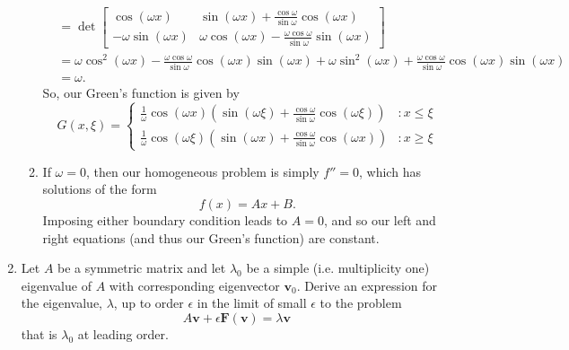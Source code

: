 \documentclass[10pt,letterpaper]{report}
\newcommand{\bvec}[1]{\mathbf{#1}}
\newcommand{\mtx}[2]{\left[\begin{array}{#1}#2\end{array}\right]}
\begin{document}
\begin{enumerate}
\begin{enumerate}
\begin{align*}
        &= \det \mtx{cc}{ \cos(\omega x) & \sin(\omega x) + \frac{\cos \omega}{\sin \omega}\cos(\omega x) \\ -\omega \sin(\omega x) & \omega \cos(\omega x) - \frac{\omega\cos \omega}{\sin \omega}\sin(\omega x)}
        \\
        &=
        \omega \cos^2(\omega x) - \frac{\omega \cos \omega}{\sin \omega}\cos(\omega x)\sin(\omega x) + \omega \sin^2(\omega x) + \frac{\omega \cos \omega}{\sin \omega} \cos(\omega x)\sin(\omega x)
        \\
        &= \omega.
    \end{align*}
    So, our Green's function is given by
    \[
    G(x, \xi) = \begin{cases}
    \frac{1}{\omega}\cos(\omega x)\left(\sin(\omega \xi) + \frac{\cos \omega}{\sin \omega}\cos(\omega \xi)\right) 
    &: x \leq \xi 
    \\
    \frac{1}{\omega}\cos(\omega \xi)\left(\sin(\omega x) + \frac{\cos \omega}{\sin \omega}\cos(\omega x)\right) 
    &: x \geq \xi
    \end{cases}
    \]
    \item If $\omega = 0$, then our homogeneous problem is simply $f'' = 0$, which has solutions of the form
    \[
    f(x) = Ax + B.
    \]
    Imposing either boundary condition leads to $A = 0$, and so our left and right equations (and thus our Green's function) are constant.
\end{enumerate}

\item \begin{qbox}
Let $A$ be a symmetric matrix and let $\lambda_0$ be a simple (i.e. multiplicity one) eigenvalue of $A$ with corresponding eigenvector $\bvec v_0$. Derive an expression for the eigenvalue, $\lambda$, up to
order $\epsilon$ in the limit of small $\epsilon$ to the problem
\[
A\bvec v + \epsilon \bvec F(\bvec v) = \lambda \bvec v
\]
that is $\lambda_0$ at leading order.
\end{qbox}


\end{enumerate}
\end{document}
